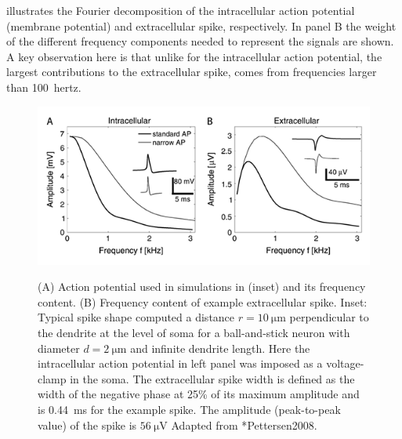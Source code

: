  illustrates the Fourier decomposition of the intracellular action potential (membrane potential) and extracellular spike, respectively. In panel B the weight of the different frequency components needed to represent the signals are shown. A key observation here is that unlike for the intracellular action potential, the largest contributions to the extracellular spike, comes from frequencies larger than 100~hertz.


\begin{figure}[!ht]
\begin{center}
\includegraphics{Figures/Spikes/Spikes-ball-and-stick-frequency-w90-r150}
\end{center}
\caption[]{(A) Action potential used in simulations in (inset) 
and its frequency content.
(B) Frequency content of example extracellular spike. Inset: Typical spike shape computed a distance $r=10~\si{\micro\metre}$ perpendicular to the dendrite at the level of soma for a ball-and-stick neuron with diameter $d=2~\si{\micro\metre}$ and infinite dendrite length. Here the intracellular action potential in left panel was imposed as a voltage-clamp in the soma.
The extracellular spike width is defined as the width of the negative phase at 25\% of its maximum
amplitude and is 0.44~ms for the example spike. The amplitude (peak-to-peak value) of the spike is $56~\si{\micro\volt}$  
  Adapted from \citeasnoun**{Pettersen2008}.}
 
\label{fig:Spikes:ball-and-stick-frequency}
\end{figure}

